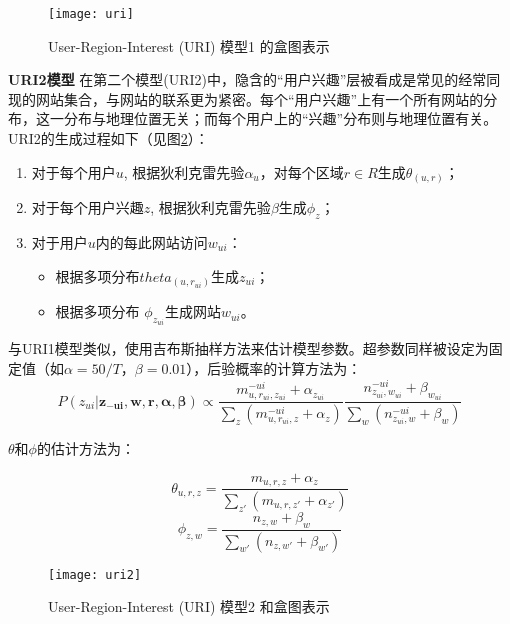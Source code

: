 \begin{figure}
\centering
\texttt{[image: uri]}
\caption{User-Region-Interest (URI) 模型1 的盒图表示}
\label{interest:fig:uri}
\end{figure}

\textbf{URI2模型} 在第二个模型(URI2)中，隐含的``用户兴趣''层被看成是常见的经常同现的网站集合，与网站的联系更为紧密。每个``用户兴趣''上有一个所有网站的分布，这一分布与地理位置无关；而每个用户上的``兴趣''分布则与地理位置有关。URI2的生成过程如下（见图\ref{interest:fig:uri2}）：
\begin{enumerate}
	\item 对于每个用户$u$, 根据狄利克雷先验$\alpha_u$，对每个区域$r \in R$生成$\theta_{(u,r)}$；
	\item 对于每个用户兴趣$z$, 根据狄利克雷先验$\beta$生成$\phi_z$；
	\item 对于用户$u$内的每此网站访问$w_{ui}$：
	\begin{itemize}
		\item 根据多项分布$theta_{(u,r_{ui})}$生成$z_{ui}$；
		\item 根据多项分布 $\phi_{z_{ui}}$生成网站$w_{ui}$。
	\end{itemize}
\end{enumerate}

与URI1模型类似，使用吉布斯抽样方法来估计模型参数。超参数同样被设定为固定值（如$\alpha = 50 / T$，$\beta = 0.01$），后验概率的计算方法为：
	\begin{equation}
	P(z_{ui}|\mathbf{z_{-ui}},\mathbf{w}, \mathbf{r}, \mathbf{\alpha}, \mathbf{\beta}) \propto
	  \frac{m^{-ui}_{u,r_{ui},z_{ui}} + \alpha_{z_{ui}}}{\sum_{z}{(m^{-ui}_{u,r_{ui},z} + \alpha_z)}}
		\frac{n^{-ui}_{z_{ui},w_{ui}} + \beta_{w_{ui}}}{\sum_{w}{(n^{-ui}_{z_{ui},w} + \beta_w)}}
\end{equation}

$\theta$和$\phi$的估计方法为：

\begin{equation}
\label{interest:equ:theta2}
	\theta_{u,r,z} = \frac{m_{u,r,z} + \alpha_z}{\sum_{z'}{(m_{u,r,z'} + \alpha_{z'})}}
\end{equation}
\begin{equation}
	\phi_{z,w} = \frac{n_{z,w} + \beta_w}{\sum_{w'}{(n_{z,w'} + \beta_{w'})}}
\end{equation}

\begin{figure}
\centering
\texttt{[image: uri2]}
\caption{User-Region-Interest (URI) 模型2 和盒图表示}
\label{interest:fig:uri2}
\end{figure}


